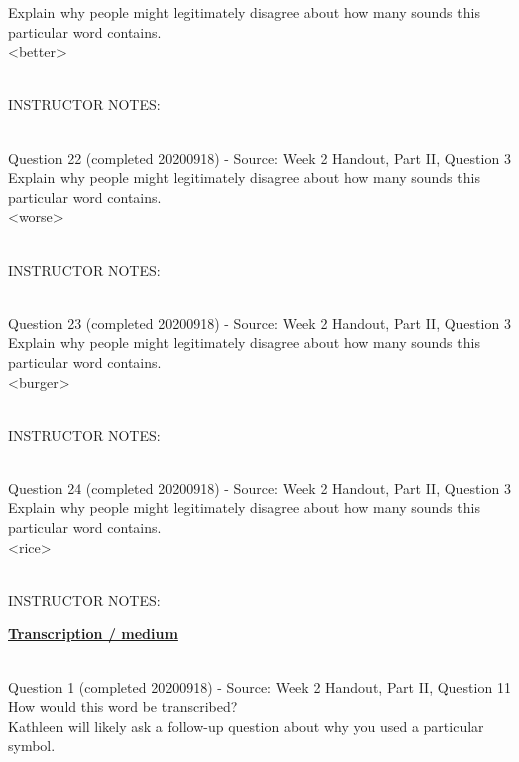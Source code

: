 \documentclass[12pt]{article}
\begin{document}
Explain why people might legitimately disagree about how many sounds this particular word contains.\\

<better>


~\\
INSTRUCTOR NOTES: 


~\\

{\large Question 22} (completed 20200918) - Source: Week 2 Handout, Part II, Question 3\\

Explain why people might legitimately disagree about how many sounds this particular word contains.\\

<worse>


~\\
INSTRUCTOR NOTES: 


~\\

{\large Question 23} (completed 20200918) - Source: Week 2 Handout, Part II, Question 3\\

Explain why people might legitimately disagree about how many sounds this particular word contains.\\

<burger>


~\\
INSTRUCTOR NOTES: 


~\\

{\large Question 24} (completed 20200918) - Source: Week 2 Handout, Part II, Question 3\\

Explain why people might legitimately disagree about how many sounds this particular word contains.\\

<rice>


~\\
INSTRUCTOR NOTES: 


\newpage\textbf{\underline{\huge Transcription / medium\\}}

~\\

{\large Question 1} (completed 20200918) - Source: Week 2 Handout, Part II, Question 11\\

How would this word be transcribed?\\ Kathleen will likely ask a follow-up question about why you used a particular symbol.\\
\end{document}
